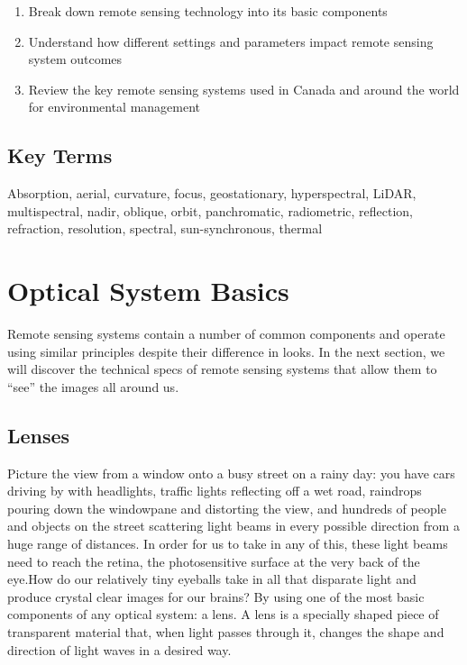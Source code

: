 \documentclass[
]{book}
\providecommand{\tightlist}{%
  \setlength{\itemsep}{0pt}\setlength{\parskip}{0pt}}
\begin{document}
\begin{enumerate}
\def\labelenumi{\arabic{enumi}.}
\tightlist
\item
  Break down remote sensing technology into its basic components
\item
  Understand how different settings and parameters impact remote sensing system outcomes
\item
  Review the key remote sensing systems used in Canada and around the world for environmental management
\end{enumerate}

\hypertarget{key-terms-11}{%
\subsection*{Key Terms}\label{key-terms-11}}

Absorption, aerial, curvature, focus, geostationary, hyperspectral, LiDAR, multispectral, nadir, oblique, orbit, panchromatic, radiometric, reflection, refraction, resolution, spectral, sun-synchronous, thermal

\hypertarget{optical-system-basics}{%
\section{Optical System Basics}\label{optical-system-basics}}

Remote sensing systems contain a number of common components and operate using similar principles despite their difference in looks. In the next section, we will discover the technical specs of remote sensing systems that allow them to ``see'' the images all around us.

\hypertarget{lenses}{%
\subsection{Lenses}\label{lenses}}

Picture the view from a window onto a busy street on a rainy day: you have cars driving by with headlights, traffic lights reflecting off a wet road, raindrops pouring down the windowpane and distorting the view, and hundreds of people and objects on the street scattering light beams in every possible direction from a huge range of distances. In order for us to take in any of this, these light beams need to reach the retina, the photosensitive surface at the very back of the eye.How do our relatively tiny eyeballs take in all that disparate light and produce crystal clear images for our brains? By using one of the most basic components of any optical system: a lens. A lens is a specially shaped piece of transparent material that, when light passes through it, changes the shape and direction of light waves in a desired way.
\end{document}
